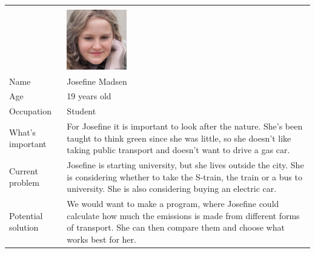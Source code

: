 \noindent
\begin{tabularx}{\textwidth}{ | l X | }
    \hline
    &                                                         \\
    & \includegraphics[width=0.25\textwidth]{images/josefine} \\
    Name       & Josefine Madsen                                         \\
    Age        & 19 years old                                            \\
    Occupation & Student                                                 \\
    What's important & For Josefine it is important to look after the nature.
    She's been taught to think green since she was little, so she doesn't like taking public transport and doesn't want
    to drive a gas car. \\
    Current problem & Josefine is starting university, but she lives outside the city.
    She is considering whether to take the S-train, the train or a bus to university.
    She is also considering buying an electric car. \\
    Potential solution & We would want to make a program, where Josefine could calculate how much the emissions is made
    from different forms of transport.
    She can then compare them and choose what works best for her. \\
    \hline
\end{tabularx}


